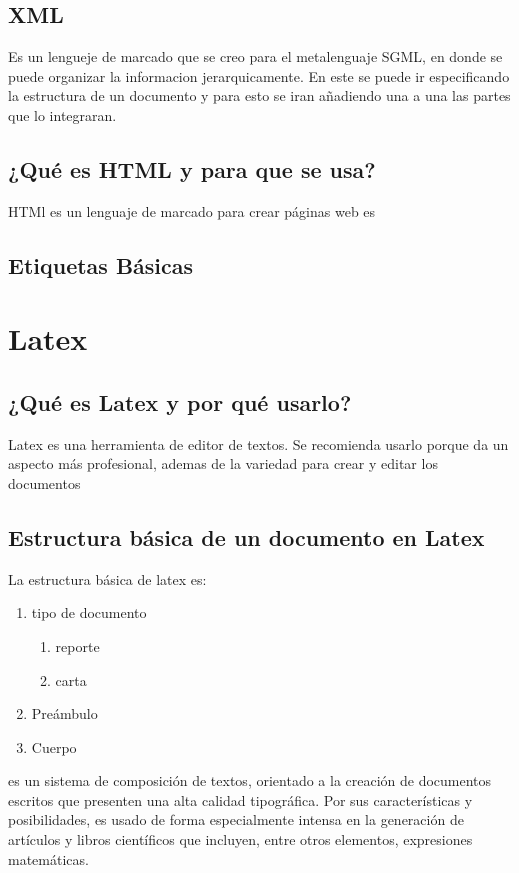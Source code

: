\documentclass[11pt,letterpaper]{article}
\begin{document}
\subsection{XML}
Es un lengueje de marcado que se creo para el metalenguaje SGML, en donde se puede organizar la informacion jerarquicamente.
En este se puede ir especificando la estructura de un documento y para esto se iran añadiendo una a una las partes que lo integraran.
\subsection{¿Qué es HTML y para que se usa?}
HTMl es un lenguaje de marcado para crear páginas web
es\subsection{Etiquetas Básicas}

\section{Latex}
\subsection{¿Qué es Latex y por qué usarlo?}
Latex es una herramienta de editor de textos. Se recomienda usarlo porque da un aspecto más profesional, ademas de la variedad para crear y editar los documentos
\subsection{Estructura básica de un documento en Latex}
La estructura básica de latex es:
\begin{enumerate}
\item tipo de documento
  \begin{enumerate}
  \item reporte
  \item carta
  \end{enumerate}
\item Preámbulo
\item Cuerpo
\end{enumerate}
es un sistema de composición de textos, orientado a la creación de documentos escritos que presenten una alta calidad tipográfica. Por sus características y posibilidades, es usado de forma especialmente intensa en la generación de artículos y libros científicos que incluyen, entre otros elementos, expresiones matemáticas.
\end{document}
